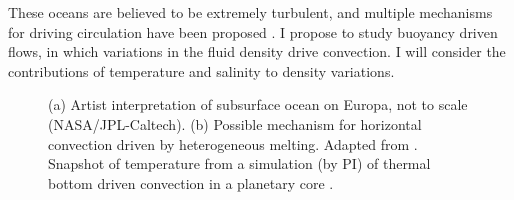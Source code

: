 \documentclass[12pt]{article}
\begin{document}
These oceans are believed to be extremely turbulent, and multiple mechanisms for driving circulation have been proposed \citep{kS24}.
I propose to study buoyancy driven flows, in which variations in the fluid density drive convection.
I will consider the contributions of temperature and salinity to density variations.

\begin{figure}[H]
	\begin{center}
		\quad
	\end{center}
	\caption{(a) Artist interpretation of subsurface ocean on Europa, not to scale (NASA/JPL-Caltech). (b) Possible mechanism for horizontal convection driven by heterogeneous melting. Adapted from \citep{wK22}. Snapshot of temperature from a simulation (by PI) of thermal bottom driven convection in a planetary core \citep{tO25}.}
	\label{f:pic}
\end{figure}
\end{document}

